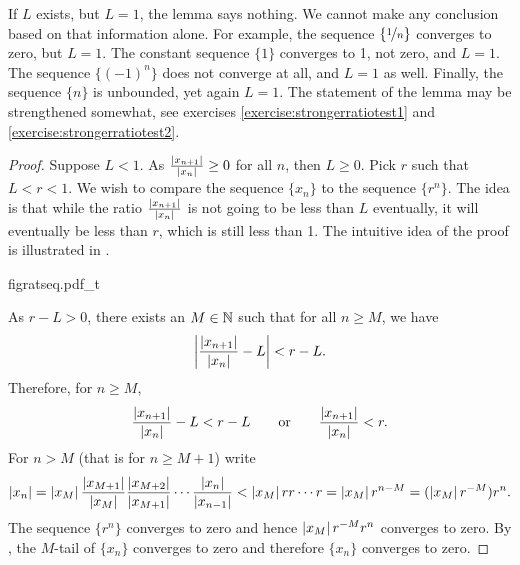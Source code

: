 If $L$ exists, but $L=1$, the lemma says nothing.  We cannot make any
conclusion based on that information alone.  For example,
the sequence $\{ \nicefrac{1}{n} \}$ converges to zero, but $L=1$.
The constant sequence $\{ 1 \}$ converges to 1, not zero, and 
$L=1$.  The sequence $\{ {(-1)}^n \}$ does not converge at all, and $L=1$ as
well.
Finally, the sequence $\{  n \}$ is unbounded, yet again $L=1$.
The statement of the lemma may be strengthened somewhat, see 
exercises \ref{exercise:strongerratiotest1} and
\ref{exercise:strongerratiotest2}.

\begin{proof}
Suppose $L < 1$.
As
$\frac{\left\lvert {x_{n+1}} \right\rvert}{\left\lvert {x_n} \right\rvert} \geq 0$ for all $n$, then $L \geq 0$.  Pick
$r$ such that $L < r < 1$.
We wish to compare the sequence $\{ x_n \}$ to the sequence $\{ r^n \}$.  The idea is that
while the ratio $\frac{\abs{x_{n+1}}}{\abs{x_n}}$ is not going to be less than $L$ eventually,
it will eventually be less than $r$, which is still less than 1.
The intuitive idea of the proof is illustrated in .
\begin{myfigureht}
{figratseq.pdf_t}
\caption{Proof of ratio test in picture.  The short lines represent the
ratios 
$\frac{\abs{x_{n+1}}}{\abs{x_n}}$
approaching $L$.\label{figratseq}}
\end{myfigureht}

As $r-L > 0$, there exists an $M \in {\mathbb{N}}$ such that for
all $n \geq M$, we have
\begin{equation*}
\left\lvert {\frac{\left\lvert {x_{n+1}} \right\rvert}{\left\lvert {x_n} \right\rvert} - L} \right\rvert < r-L .
\end{equation*}
Therefore, for $n \geq M$,
\begin{equation*}
\frac{\left\lvert {x_{n+1}} \right\rvert}{\left\lvert {x_n} \right\rvert} - L < r-L 
\qquad \text{or} \qquad
\frac{\left\lvert {x_{n+1}} \right\rvert}{\left\lvert {x_n} \right\rvert} < r .
\end{equation*}
For $n > M$ (that is for $n \geq M+1$)
write
\begin{equation*}
\left\lvert {x_n} \right\rvert =
\left\lvert {x_M} \right\rvert
\frac{\left\lvert {x_{M+1}} \right\rvert}{\left\lvert {x_{M}} \right\rvert}
\frac{\left\lvert {x_{M+2}} \right\rvert}{\left\lvert {x_{M+1}} \right\rvert}
\cdots
\frac{\left\lvert {x_{n}} \right\rvert}{\left\lvert {x_{n-1}} \right\rvert}
<
\left\lvert {x_M} \right\rvert
r r \cdots r = \left\lvert {x_M} \right\rvert r^{n-M} = (\left\lvert {x_M} \right\rvert r^{-M}) r^n .
\end{equation*}
The sequence $\{ r^n \}$ converges to zero and hence 
$\left\lvert {x_M} \right\rvert r^{-M} r^n$ converges to zero.  By ,
the $M$-tail of 
$\{x_n\}$ converges to zero and therefore $\{x_n\}$ converges to zero.


\end{proof}
